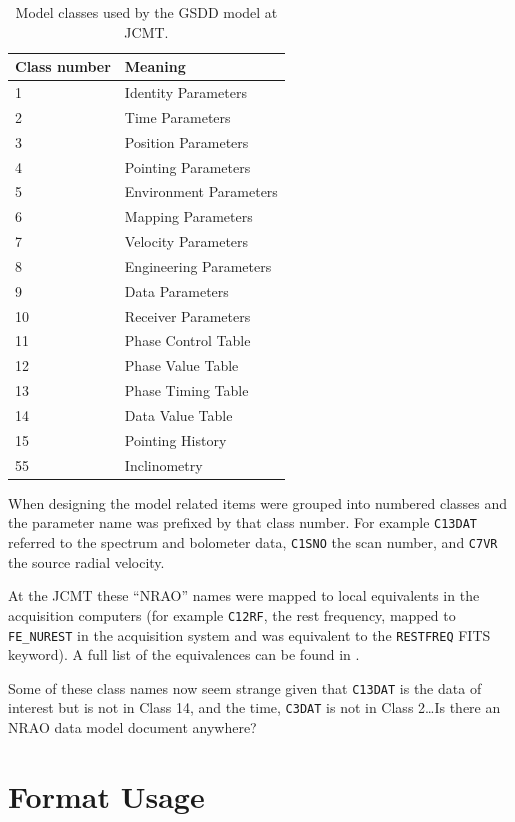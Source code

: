 \documentclass[final,authoryear,5p,times,twocolumn]{elsarticle}
\begin{document}
\begin{table}
\caption{Model classes used by the GSDD model at JCMT.}
\label{tab:classes}
\begin{center}
\begin{tabular}{ll}
\hline
Class number & Meaning \\ \hline
1 & Identity Parameters\\
2 & Time Parameters\\
3 & Position Parameters\\
4 & Pointing Parameters \\
5 & Environment Parameters \\
6 & Mapping Parameters \\
7 & Velocity Parameters \\
8 & Engineering Parameters \\
9 & Data Parameters \\
10 & Receiver Parameters\\
11 & Phase Control Table \\
12 & Phase Value Table \\
13 & Phase Timing Table \\
14 & Data Value Table \\
15 & Pointing History \\
55 & Inclinometry \\
\hline
\end{tabular}
\end{center}
\end{table}

When designing the model related items were grouped into numbered
classes and the parameter name was prefixed by that class number. For
example \texttt{C13DAT} referred to the spectrum and bolometer data,
\texttt{C1SNO} the scan number, and \texttt{C7VR} the source radial velocity.

At the JCMT these ``NRAO'' names were mapped to local equivalents in
the acquisition computers (for example \texttt{C12RF}, the rest
frequency, mapped to \texttt{FE\_NUREST} in the acquisition system and
was equivalent to the \texttt{RESTFREQ} FITS keyword). A full list of
the equivalences can be found in \citet{SUN229}.

{\color{red}
Some of these class names now seem strange given that
\texttt{C13DAT} is the data of interest but is not in Class 14, and
the time, \texttt{C3DAT} is not in Class 2\ldots Is there an NRAO
data model document anywhere?
}



\section{Format Usage}
\end{document}
